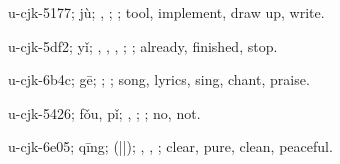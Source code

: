 \begin{multicols}{2}
{\cjkgGlue{}u-cjk-5177; jù; \cjkgGlue{}\cjkgGlue{}\cjkgGlue{}, \cjkgGlue{}\cjkgGlue{}\cjkgGlue{}; \cjkgGlue{}; tool, implement, draw up, write.

\cjkgGlue{}u-cjk-5df2; yǐ; \cjkgGlue{}\cjkgGlue{}\cjkgGlue{}, \cjkgGlue{}\cjkgGlue{}\cjkgGlue{}, \cjkgGlue{}, \cjkgGlue{}; \cjkgGlue{}; already, finished, stop.

\cjkgGlue{}u-cjk-6b4c; gē; \cjkgGlue{}\cjkgGlue{}\cjkgGlue{}; \cjkgGlue{}; song, lyrics, sing, chant, praise.

\cjkgGlue{}u-cjk-5426; fǒu, pǐ; \cjkgGlue{}, \cjkgGlue{}; \cjkgGlue{}; no, not.

\cjkgGlue{}u-cjk-6e05; qīng; \cjkgGlue{}\cjkgGlue{}(\cjkgGlue{}|\cjkgGlue{}|\cjkgGlue{}); \cjkgGlue{}, \cjkgGlue{}, \cjkgGlue{}; clear, pure, clean, peaceful.

}
\end{multicols}
